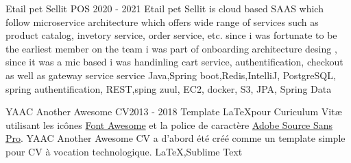 %
%
%


\begin{projects}
	\project
	{Etail pet Sellit POS }{2020 - 2021}
	{ }
	{Etail pet Sellit is cloud based SAAS which follow microservice architecture which offers wide range of services such as product catalog, invetory service, order service, etc.
	since i was fortunate to be the earliest member on the team i was part of onboarding architecture desing , since it was a mic based i was handinling cart service, authentification, checkout as well as gateway service service
	}
	{Java,Spring boot,Redis,IntelliJ, PostgreSQL, spring authentification, REST,sping zuul, EC2, docker, S3, JPA, Spring Data}
				
	\project
	{YAAC Another Awesome CV}{2013 - 2018}
	{ }
	{Template \LaTeX pour Curiculum Vitæ utilisant les icônes \href{https://fontawesome.com}{Font Awesome} et la police de caractère \href{https://fonts.google.com/specimen/Source+Sans+Pro}{Adobe Source Sans Pro}. YAAC Another Awesome CV a d'abord été créé comme un template simple pour CV à vocation technologique.}
	{\LaTeX,Sublime Text}

\end{projects}